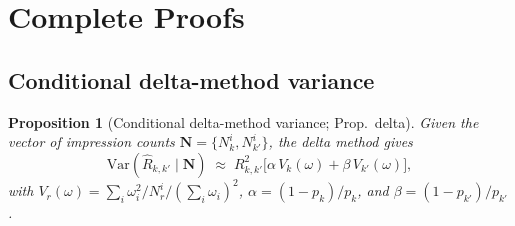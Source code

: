 \documentclass[11pt]{article}
\newtheorem{proposition}{Proposition}
\begin{document}
\section{Complete Proofs}
\label{sec:proofs}

\subsection{Conditional delta-method variance}

\begin{proposition}[Conditional delta-method variance; Prop.~delta]
\label{sup:prop:delta}
Given the vector of impression counts $\mathbf N=\{N_k^i,N_{k'}^i\}$,
the delta method gives
\[
\mathrm{Var}(\hat R_{k,k'}\mid\mathbf N)
\;\approx\;
R_{k,k'}^2\bigl[\alpha\,V_k(\omega)+\beta\,V_{k'}(\omega)\bigr],
\]
with $V_r(\omega)=\sum_i\omega_i^2/N_r^i/(\sum_i\omega_i)^2$,
$\alpha=(1-p_k)/p_k$, and $\beta=(1-p_{k'})/p_{k'}$.
\end{proposition}
\end{document}

